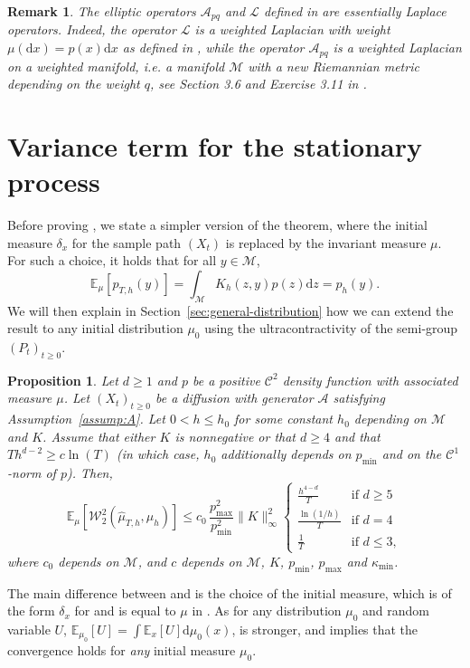 \documentclass[10pt,a4paper]{article}
\newcommand{\E}{{\mathbb E}}
\newcommand{\cL}{\mathcal{L}}
\newcommand\cA{\mathcal{A}}
\newcommand\cC{\mathcal{C}}
\newcommand\cM{\mathcal{M}}
\newcommand\W{\mathcal{W}}
\newcommand\dd{\mathrm{d}}
\newcommand{\SBRA}[1]{{{\left[#1\right]}}} %
\let \ssection=\section
\renewcommand{\section}{\setcounter{equation}{0}\ssection}
\newtheorem{remark}[theorem]{Remark}
\newtheorem{proposition}[theorem]{Proposition}
\begin{document}
\begin{remark}\label{rk:Apq}
The elliptic operators  $\cA_{pq}$ and $\cL$ defined in  are essentially Laplace operators.
Indeed, the operator $\cL$  is a weighted Laplacian with weight $\mu(\dd x)=p(x)\dd x$ as defined  in \cite[Section 3.6]{Grigoryan2009}, while the operator $\cA_{pq}$ is a weighted Laplacian on a weighted manifold, i.e. a manifold $\cM$ with a new Riemannian metric depending on the weight $q$, see Section 3.6 and Exercise 3.11 in \cite{Grigoryan2009}.
\end{remark}





\section{Variance term for the stationary process}\label{sec:proof-mainA}

Before proving , we state a simpler version of the theorem, where the initial measure $\delta_{x}$ for the sample path $(X_t)$ is replaced by the invariant measure $\mu$. For such a choice, it holds that for all $y\in \cM$,
\begin{equation}\label{eq:bias}
\E_\mu\SBRA{p_{T,h}(y)}=\int_\cM K_h(z,y)p(z)\dd z=p_h(y).
\end{equation}
 We will then explain in Section~\ref{sec:general-distribution} how we can extend the result to any initial distribution $\mu_0$  using the ultracontractivity of the semi-group $(P_t)_{t\ge 0}$.

\begin{proposition}\label{prop:variance}
Let $d\ge 1$ and $p$ be a positive $\cC^2$ density function with associated measure $\mu$.  
Let $(X_t)_{t\ge 0}$ be a diffusion with generator $\cA$ satisfying Assumption~\ref{assump:A}. Let $0<h\le h_0$ for some constant $h_0$ depending on $\cM$ and $K$. Assume that either $K$ is nonnegative or that   $d\ge 4$ and that $Th^{d-2}\ge c\ln(T)$ (in which case, $h_0$ additionally depends on  $p_{\min}$ and on  the $\cC^1$-norm of $p$). Then,
\begin{equation}
    \mathbb{E}_\mu\SBRA{\W_2^2(\widehat{\mu}_{T,h},\mu_h)} \le c_0\, \frac{p_{\max}^2}{p_{\min}^2} \|K\|_\infty^2 \begin{cases}
\frac{h^{4-d}}{T} &\text{if }d\ge 5\\
\frac{\ln(1/h)}T &\text{if } d=4\\
\frac{1}T &\text{if }d\le 3,
    \end{cases}
\end{equation}
where 
$c_0$ depends on $\cM$, and $c$ depends on $\cM$, $K$, $p_{\min}$, $p_{\max}$ and $\kappa_{\min}$.
\end{proposition}
The main difference between  and  is the choice of the initial measure, which is of the form $\delta_x$ for  and is equal to $\mu$ in . As for any distribution $\mu_0$ and random variable $U$, $\E_{\mu_0}[U]=\int \E_x[U]\dd \mu_0(x)$,  is stronger, and implies that the convergence holds for \textit{any} initial measure $\mu_0$.
\end{document}
